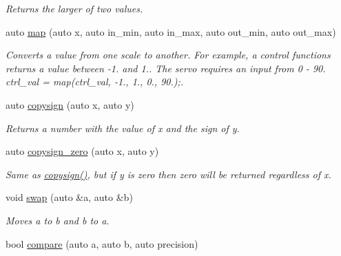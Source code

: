 \begin{DoxyCompactItemize}
\begin{DoxyCompactList}\small\item\em Returns the larger of two values. \end{DoxyCompactList}\item 
\hypertarget{namespaceetk_a5c4722af8a58319b06077130fe759644}{auto \hyperlink{namespaceetk_a5c4722af8a58319b06077130fe759644}{map} (auto x, auto in\-\_\-min, auto in\-\_\-max, auto out\-\_\-min, auto out\-\_\-max)}\label{namespaceetk_a5c4722af8a58319b06077130fe759644}

\begin{DoxyCompactList}\small\item\em Converts a value from one scale to another. For example, a control functions returns a value between -\/1. and 1.. The servo requires an input from 0 -\/ 90. ctrl\-\_\-val = map(ctrl\-\_\-val, -\/1., 1., 0., 90.);. \end{DoxyCompactList}\item 
\hypertarget{namespaceetk_a29b7cb3d14a2ff168ee94a40797577fe}{auto \hyperlink{namespaceetk_a29b7cb3d14a2ff168ee94a40797577fe}{copysign} (auto x, auto y)}\label{namespaceetk_a29b7cb3d14a2ff168ee94a40797577fe}

\begin{DoxyCompactList}\small\item\em Returns a number with the value of x and the sign of y. \end{DoxyCompactList}\item 
\hypertarget{namespaceetk_a784f32aa2a3661196e1cf73218c53670}{auto \hyperlink{namespaceetk_a784f32aa2a3661196e1cf73218c53670}{copysign\-\_\-zero} (auto x, auto y)}\label{namespaceetk_a784f32aa2a3661196e1cf73218c53670}

\begin{DoxyCompactList}\small\item\em Same as \hyperlink{namespaceetk_a29b7cb3d14a2ff168ee94a40797577fe}{copysign()}, but if y is zero then zero will be returned regardless of x. \end{DoxyCompactList}\item 
\hypertarget{namespaceetk_ad6c98a88251cf3ccfeabc675507ee871}{void \hyperlink{namespaceetk_ad6c98a88251cf3ccfeabc675507ee871}{swap} (auto \&a, auto \&b)}\label{namespaceetk_ad6c98a88251cf3ccfeabc675507ee871}

\begin{DoxyCompactList}\small\item\em Moves a to b and b to a. \end{DoxyCompactList}\item 
\hypertarget{namespaceetk_a445cf4f2d0d126c0a1b67891f03408a6}{bool \hyperlink{namespaceetk_a445cf4f2d0d126c0a1b67891f03408a6}{compare} (auto a, auto b, auto precision)}\label{namespaceetk_a445cf4f2d0d126c0a1b67891f03408a6}


\end{DoxyCompactItemize}
